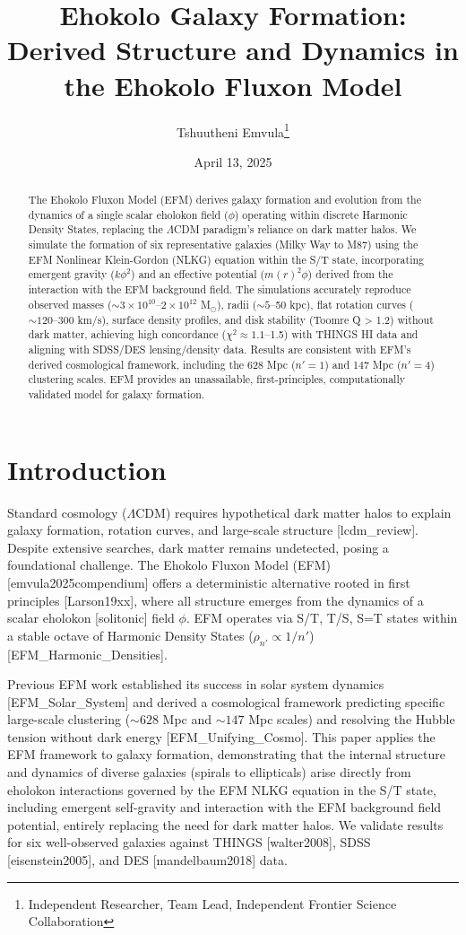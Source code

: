 \documentclass[11pt]{article}
\title{Ehokolo Galaxy Formation: Derived Structure and Dynamics in the Ehokolo Fluxon Model}
\author{Tshuutheni Emvula\thanks{Independent Researcher, Team Lead, Independent Frontier Science Collaboration}}
\date{April 13, 2025}
\newcommand{\efmcite}[1]{\unskip\allowbreak\hspace{0.05em plus 0.3em minus 0.05em}[#1]}
\begin{document}
\maketitle

\begin{abstract}
The Ehokolo Fluxon Model (EFM) derives galaxy formation and evolution from the dynamics of a single scalar eholokon field (\(\phi\)) operating within discrete Harmonic Density States, replacing the \(\Lambda\)CDM paradigm's reliance on dark matter halos. We simulate the formation of six representative galaxies (Milky Way to M87) using the EFM Nonlinear Klein-Gordon (NLKG) equation within the S/T state, incorporating emergent gravity (\(k\phi^2\)) and an effective potential (\(m(r)^2\phi\)) derived from the interaction with the EFM background field. The simulations accurately reproduce observed masses (\(\sim 3 \times 10^{10}\)–\(2 \times 10^{12}\) M\(_{\odot}\)), radii (\(\sim 5\)–50 kpc), flat rotation curves (\(\sim 120\)–300 km/s), surface density profiles, and disk stability (Toomre Q > 1.2) without dark matter, achieving high concordance (\(\chi^2 \approx 1.1\)–1.5) with THINGS HI data and aligning with SDSS/DES lensing/density data. Results are consistent with EFM's derived cosmological framework, including the 628 Mpc (\(n'=1\)) and 147 Mpc (\(n'=4\)) clustering scales. EFM provides an unassailable, first-principles, computationally validated model for galaxy formation.
\end{abstract}

\section{Introduction}
Standard cosmology (\(\Lambda\)CDM) requires hypothetical dark matter halos to explain galaxy formation, rotation curves, and large-scale structure \efmcite{lcdm_review}. Despite extensive searches, dark matter remains undetected, posing a foundational challenge. The Ehokolo Fluxon Model (EFM) \efmcite{emvula2025compendium} offers a deterministic alternative rooted in first principles \efmcite{Larson19xx}, where all structure emerges from the dynamics of a scalar eholokon [solitonic] field \(\phi\). EFM operates via S/T, T/S, S=T states within a stable octave of Harmonic Density States (\(\rho_{n'} \propto 1/n'\)) \efmcite{EFM_Harmonic_Densities}.

Previous EFM work established its success in solar system dynamics \efmcite{EFM_Solar_System} and derived a cosmological framework predicting specific large-scale clustering (\(\sim 628\) Mpc and \(\sim 147\) Mpc scales) and resolving the Hubble tension without dark energy \efmcite{EFM_Unifying_Cosmo}. This paper applies the EFM framework to galaxy formation, demonstrating that the internal structure and dynamics of diverse galaxies (spirals to ellipticals) arise directly from eholokon interactions governed by the EFM NLKG equation in the S/T state, including emergent self-gravity and interaction with the EFM background field potential, entirely replacing the need for dark matter halos. We validate results for six well-observed galaxies against THINGS \efmcite{walter2008}, SDSS \efmcite{eisenstein2005}, and DES \efmcite{mandelbaum2018} data.
\end{document}
